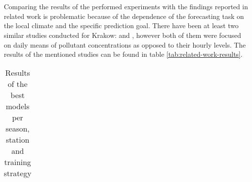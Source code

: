 \\\\
Comparing the results of the performed experiments with the findings reported in related work is problematic because of the dependence of the forecasting task on the local climate and the specific prediction goal. There have been at least two similar studies conducted for Krakow: \cite{LOZOWICKA2005} and \cite{Pawul2016}, however both of them were focused on daily means of pollutant concentrations as opposed to their hourly levels. The results of the mentioned studies can be found in table \ref{tab:related-work-results}.

\begin{landscape}
\begin{table}[ht]
\centering
\caption{Results of the best models per season, station and training strategy}
\label{tab:results-best-models}
\footnotesize
\begin{tabular}{llllrrrr}


\end{tabular}
\end{table}
\end{landscape}
